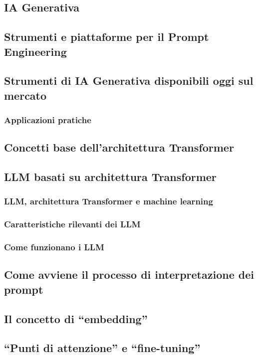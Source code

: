     \subsection{IA Generativa}
    \subsection{Strumenti e piattaforme per il Prompt Engineering}
    \subsection{Strumenti di IA Generativa disponibili oggi sul mercato}
        \subsubsection{Applicazioni pratiche}
    \subsection{Concetti base dell’architettura Transformer}
    \subsection{LLM basati su architettura Transformer}
        \subsubsection{LLM, architettura Transformer e machine learning}
        \subsubsection{Caratteristiche rilevanti dei LLM}
        \subsubsection{Come funzionano i LLM}
    \subsection{Come avviene il processo di interpretazione dei prompt}
    \subsection{Il concetto di ``embedding''}
    \subsection{``Punti di attenzione'' e ``fine-tuning''}
